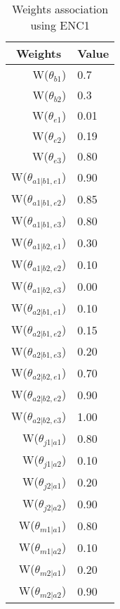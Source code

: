 \begin{table}[]
\centering
\caption{Weights association using ENC1}
\label{weightsEnc1}
\begin{tabular}{rl}
\hline
\multicolumn{1}{c}{Weights} & \multicolumn{1}{c}{Value} \\ \hline
W(\(\theta_{b1}\)) & 0.7 \\ 
W(\(\theta_{b2}\)) & 0.3 \\ 
W(\(\theta_{e1}\)) & 0.01 \\ 
W(\(\theta_{e2}\)) & 0.19 \\ 
W(\(\theta_{e3}\)) & 0.80 \\ 
W(\(\theta_{a1|b1,e1}\)) & 0.90 \\
W(\(\theta_{a1|b1,e2}\)) & 0.85 \\
W(\(\theta_{a1|b1,e3}\)) & 0.80 \\
W(\(\theta_{a1|b2,e1}\)) & 0.30 \\
W(\(\theta_{a1|b2,e2}\)) & 0.10 \\
W(\(\theta_{a1|b2,e3}\)) & 0.00 \\
W(\(\theta_{a2|b1,e1}\)) & 0.10 \\
W(\(\theta_{a2|b1,e2}\)) & 0.15 \\
W(\(\theta_{a2|b1,e3}\)) & 0.20 \\
W(\(\theta_{a2|b2,e1}\)) & 0.70 \\
W(\(\theta_{a2|b2,e2}\)) & 0.90 \\
W(\(\theta_{a2|b2,e3}\)) & 1.00 \\
W(\(\theta_{j1|a1}\)) & 0.80 \\
W(\(\theta_{j1|a2}\)) & 0.10 \\
W(\(\theta_{j2|a1}\)) & 0.20 \\
W(\(\theta_{j2|a2}\)) & 0.90 \\
W(\(\theta_{m1|a1}\)) & 0.80 \\
W(\(\theta_{m1|a2}\)) & 0.10 \\
W(\(\theta_{m2|a1}\)) & 0.20 \\
W(\(\theta_{m2|a2}\)) & 0.90
\end{tabular}
\end{table}
